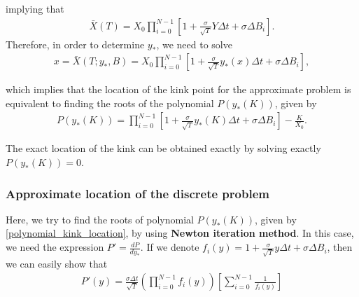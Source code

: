 \documentclass[11pt]{article}
\begin{document}
implying that
\begin{align}
	\bar{X}(T)=X_0 \prod_{i=0}^{N-1} \left[ 1+\frac{\sigma}{\sqrt{T}} Y \Delta t+ \sigma \Delta B_{i}\right].
\end{align}
Therefore, in order to determine $y_{\ast}$, we need to solve
\begin{align}
	x=\bar{X}(T;y_{\ast},B)=X_0 \prod_{i=0}^{N-1} \left[ 1+\frac{\sigma}{\sqrt{T}} y_{\ast}(x) \Delta t+ \sigma \Delta B_{i}\right],
\end{align}

which implies that the location of the kink point for the approximate problem is equivalent to finding the roots of the polynomial $P(y_\ast(K))$, given by
\begin{align}\label{polynomial_kink_location}
	P(y_{\ast}(K))=\prod_{i=0}^{N-1} \left[ 1+\frac{\sigma}{\sqrt{T}} y_\ast(K) \Delta t+ \sigma \Delta B_{i}\right]-\frac{K}{X_0}.
\end{align}

The exact location of the kink can be obtained exactly by solving exactly $P(y_{\ast}(K))=0$.

\subsubsection*{Approximate location of the discrete problem}

Here, we try to  find the roots of polynomial $P(y_{\ast}(K))$, given by \eqref{polynomial_kink_location}, by using \textbf{Newton iteration method}. In this case, we need the expression $P'=\frac{d P}{d y_\ast}$. If we denote $f_i(y)=1+\frac{\sigma}{\sqrt{T}} y \Delta t+ \sigma \Delta B_{i}$, then we can easily show that
\begin{align}\label{polynomial_kink_location_derivative}
	P'(y)=\frac{\sigma \Delta t}{\sqrt{T}} \left( \prod_{i=0}^{N-1} f_i(y)\right) \left[ \sum_{i=0}^{N-1} \frac{1}{f_i(y)}\right]
\end{align}

 
\end{document}
